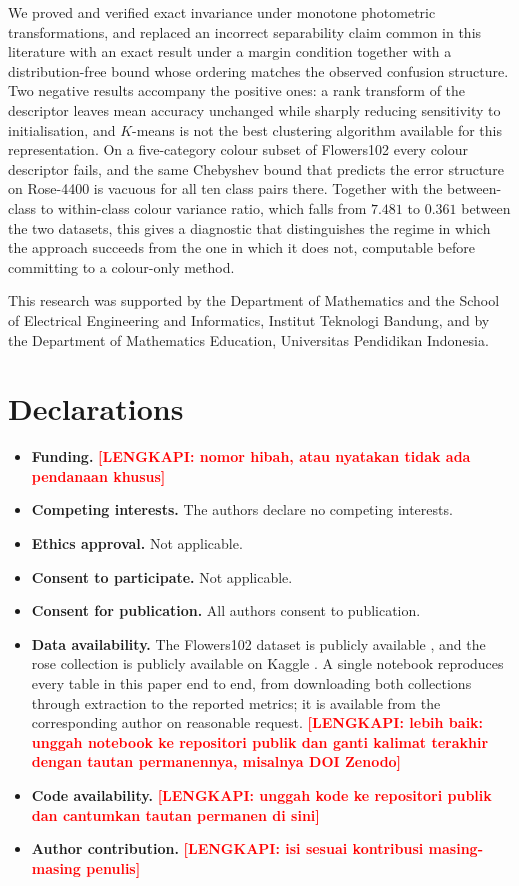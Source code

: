 \documentclass[pdflatex,sn-basic]{sn-jnl}
\theoremstyle{thmstyleone}%
\theoremstyle{thmstyletwo}%
\theoremstyle{thmstylethree}%
\newcommand{\TODO}[1]{\textcolor{red}{\textbf{[LENGKAPI: #1]}}}
\begin{document}
We proved and verified exact invariance under monotone photometric
transformations, and replaced an incorrect separability claim common in this
literature with an exact result under a margin condition together with a
distribution-free bound whose ordering matches the observed confusion
structure. Two negative results accompany the positive ones: a rank transform
of the descriptor leaves mean accuracy unchanged while sharply reducing
sensitivity to initialisation, and $K$-means is not the best clustering
algorithm available for this representation. On a five-category colour subset of Flowers102
every colour descriptor fails, and the same Chebyshev bound that predicts the
error structure on Rose-4400 is vacuous for all ten class pairs there. Together
with the between-class to within-class colour variance ratio, which falls from
$7.481$ to $0.361$ between the two datasets, this gives a diagnostic that
distinguishes the regime in which the approach succeeds from the one in which
it does not, computable before committing to a colour-only method.

\backmatter

This research was supported by the Department of Mathematics and the School of
Electrical Engineering and Informatics, Institut Teknologi Bandung, and by the
Department of Mathematics Education, Universitas Pendidikan Indonesia.

\section*{Declarations}

\begin{itemize}
\item \textbf{Funding.} \TODO{nomor hibah, atau nyatakan tidak ada pendanaan
khusus}
\item \textbf{Competing interests.} The authors declare no competing interests.
\item \textbf{Ethics approval.} Not applicable.
\item \textbf{Consent to participate.} Not applicable.
\item \textbf{Consent for publication.} All authors consent to publication.
\item \textbf{Data availability.} The Flowers102 dataset is publicly available
\cite{ref:nilsback2008}, and the rose collection is publicly available on
Kaggle \cite{ref:rosekaggle}. A single notebook reproduces every table in
this paper end to end, from downloading both collections through extraction to
the reported metrics; it is available from the corresponding author on
reasonable request. \TODO{lebih baik: unggah notebook ke repositori publik dan
ganti kalimat terakhir dengan tautan permanennya, misalnya DOI Zenodo}
\item \textbf{Code availability.} \TODO{unggah kode ke repositori publik dan
cantumkan tautan permanen di sini}
\item \textbf{Author contribution.} \TODO{isi sesuai kontribusi masing-masing
penulis}
\end{itemize}
\end{document}
